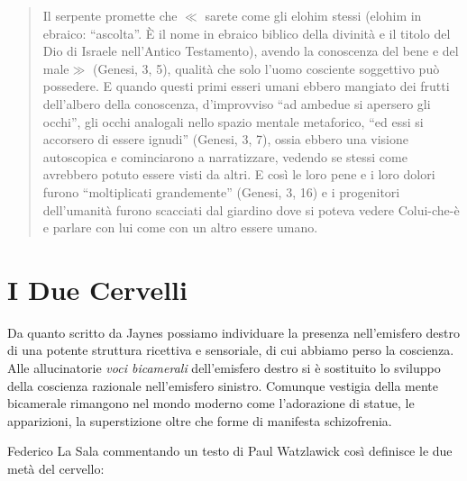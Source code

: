 \begin{quote}
Il serpente promette che $\ll$ sarete come gli elohim stessi (elohim in ebraico:
“ascolta”. È il nome in ebraico biblico della divinità e il titolo del Dio di
Israele nell'Antico Testamento), avendo la conoscenza del bene e del male$\gg$
(Genesi, 3, 5), qualità che solo l'uomo cosciente soggettivo può possedere.
E quando questi primi esseri umani ebbero mangiato dei frutti dell'albero della conoscenza, d'improvviso “ad ambedue si apersero gli occhi”, gli occhi analogali
nello spazio mentale metaforico, “ed essi si accorsero di essere ignudi” (Genesi,
3, 7), ossia ebbero una visione autoscopica e cominciarono a narratizzare,
vedendo se stessi come avrebbero potuto essere visti da altri. E così le loro
pene e i loro dolori furono “moltiplicati grandemente” (Genesi, 3, 16) e i
progenitori dell'umanità furono scacciati dal giardino dove si poteva vedere
Colui-che-è e parlare con lui come con un altro essere umano.
\end{quote}

\section{I Due Cervelli}

Da quanto scritto da Jaynes possiamo individuare la presenza nell’emisfero destro
di una potente struttura ricettiva e  sensoriale, di cui abbiamo perso la
coscienza. Alle allucinatorie  \emph{voci bicamerali} dell’emisfero destro si è
sostituito lo sviluppo della coscienza razionale  nell’emisfero sinistro. Comunque
vestigia della mente bicamerale rimangono nel mondo moderno come  l’adorazione
di statue, le apparizioni, la superstizione oltre che forme di manifesta
schizofrenia.

Federico La Sala  commentando  un  testo di Paul Watzlawick così definisce
le due metà del cervello:

